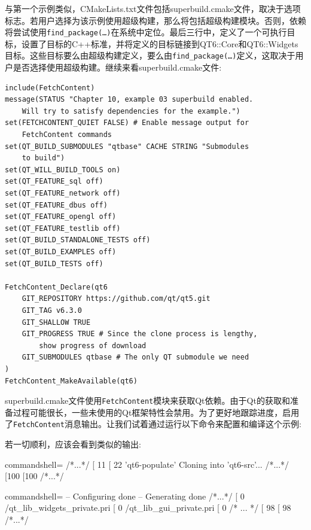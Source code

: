 与第一个示例类似，CMakeLists.txt文件包括superbuild.cmake文件，取决于选项标志。若用户选择为该示例使用超级构建，那么将包括超级构建模块。否则，依赖将尝试使用\texttt{find\_package(…)}在系统中定位。最后三行中，定义了一个可执行目标，设置了目标的C++标准，并将定义的目标链接到QT6::Core和QT6::Widgets目标。这些目标要么由超级构建定义，要么由\texttt{find\_package(…)}定义，这取决于用户是否选择使用超级构建。继续来看superbuild.cmake文件:

\begin{lstlisting}[style=styleCMake]
include(FetchContent)
message(STATUS "Chapter 10, example 03 superbuild enabled.
	Will try to satisfy dependencies for the example.")
set(FETCHCONTENT_QUIET FALSE) # Enable message output for
	FetchContent commands
set(QT_BUILD_SUBMODULES "qtbase" CACHE STRING "Submodules
	to build")
set(QT_WILL_BUILD_TOOLS on)
set(QT_FEATURE_sql off)
set(QT_FEATURE_network off)
set(QT_FEATURE_dbus off)
set(QT_FEATURE_opengl off)
set(QT_FEATURE_testlib off)
set(QT_BUILD_STANDALONE_TESTS off)
set(QT_BUILD_EXAMPLES off)
set(QT_BUILD_TESTS off)

FetchContent_Declare(qt6
	GIT_REPOSITORY https://github.com/qt/qt5.git
	GIT_TAG v6.3.0
	GIT_SHALLOW TRUE
	GIT_PROGRESS TRUE # Since the clone process is lengthy,
		show progress of download
	GIT_SUBMODULES qtbase # The only QT submodule we need
)
FetchContent_MakeAvailable(qt6)
\end{lstlisting}

superbuild.cmake文件使用\texttt{FetchContent}模块来获取Qt依赖。由于Qt的获取和准备过程可能很长，一些未使用的Qt框架特性会禁用。为了更好地跟踪进度，启用了\texttt{FetchContent}消息输出。让我们试着通过运行以下命令来配置和编译这个示例:


若一切顺利，应该会看到类似的输出:

\begin{tcblisting}{commandshell={}}
/*...*/
[ 11%
[ 22%
  'qt6-populate'
Cloning into 'qt6-src'...
/*...*/
[100%
[100%
/*...*/
\end{tcblisting}
\begin{tcblisting}{commandshell={}}
-- Configuring done
-- Generating done
/*...*/
[ 0%
  /qt_lib_widgets_private.pri
[ 0%
/qt_lib_gui_private.pri
[ 0%
/* ... */
[ 98%
[ 98%
/*...*/
\end{tcblisting}

